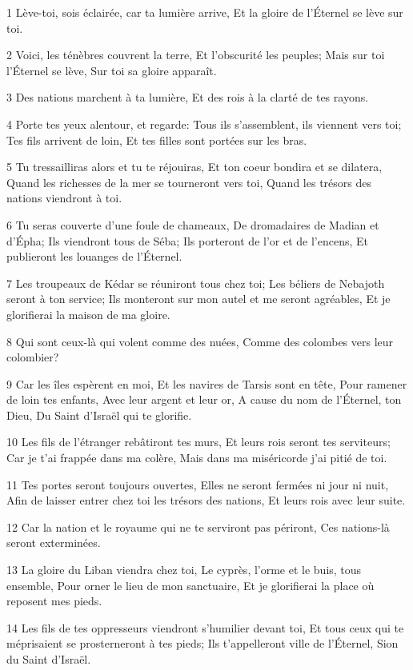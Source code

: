 \par 1 Lève-toi, sois éclairée, car ta lumière arrive, Et la gloire de l'Éternel se lève sur toi.
\par 2 Voici, les ténèbres couvrent la terre, Et l'obscurité les peuples; Mais sur toi l'Éternel se lève, Sur toi sa gloire apparaît.
\par 3 Des nations marchent à ta lumière, Et des rois à la clarté de tes rayons.
\par 4 Porte tes yeux alentour, et regarde: Tous ils s'assemblent, ils viennent vers toi; Tes fils arrivent de loin, Et tes filles sont portées sur les bras.
\par 5 Tu tressailliras alors et tu te réjouiras, Et ton coeur bondira et se dilatera, Quand les richesses de la mer se tourneront vers toi, Quand les trésors des nations viendront à toi.
\par 6 Tu seras couverte d'une foule de chameaux, De dromadaires de Madian et d'Épha; Ils viendront tous de Séba; Ils porteront de l'or et de l'encens, Et publieront les louanges de l'Éternel.
\par 7 Les troupeaux de Kédar se réuniront tous chez toi; Les béliers de Nebajoth seront à ton service; Ils monteront sur mon autel et me seront agréables, Et je glorifierai la maison de ma gloire.
\par 8 Qui sont ceux-là qui volent comme des nuées, Comme des colombes vers leur colombier?
\par 9 Car les îles espèrent en moi, Et les navires de Tarsis sont en tête, Pour ramener de loin tes enfants, Avec leur argent et leur or, A cause du nom de l'Éternel, ton Dieu, Du Saint d'Israël qui te glorifie.
\par 10 Les fils de l'étranger rebâtiront tes murs, Et leurs rois seront tes serviteurs; Car je t'ai frappée dans ma colère, Mais dans ma miséricorde j'ai pitié de toi.
\par 11 Tes portes seront toujours ouvertes, Elles ne seront fermées ni jour ni nuit, Afin de laisser entrer chez toi les trésors des nations, Et leurs rois avec leur suite.
\par 12 Car la nation et le royaume qui ne te serviront pas périront, Ces nations-là seront exterminées.
\par 13 La gloire du Liban viendra chez toi, Le cyprès, l'orme et le buis, tous ensemble, Pour orner le lieu de mon sanctuaire, Et je glorifierai la place où reposent mes pieds.
\par 14 Les fils de tes oppresseurs viendront s'humilier devant toi, Et tous ceux qui te méprisaient se prosterneront à tes pieds; Ils t'appelleront ville de l'Éternel, Sion du Saint d'Israël.
